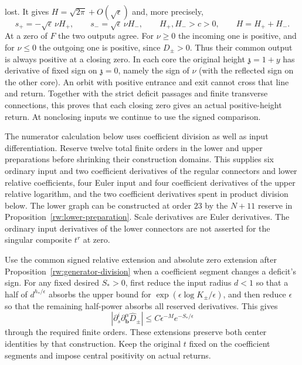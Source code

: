 lost. It gives $H=\sqrt{2\pi}+O(\sqrt\epsilon)$ and, more precisely,
\[
 s_+=-\sqrt\epsilon\,\nu H_+,
 \qquad s_-=\sqrt\epsilon\,\nu H_-,
 \qquad H_+,H_->c>0,\qquad H=H_++H_-.
\]
At a zero of $F$ the two outputs agree. For $\nu\ge0$ the
incoming one is positive, and for $\nu\le0$ the outgoing one is
positive, since $D_\pm>0$. Thus their common output is always
positive at a closing zero. In each core the original height
$\mathfrak z=1+y$ has derivative of fixed sign on $\mathfrak z=0$,
namely the sign of $\nu$ (with the reflected sign on the other
core). An orbit with positive entrance and exit cannot cross that
line and return. Together with the strict deficit passages and finite
transverse connections, this proves that each closing zero gives an actual
positive-height return. At nonclosing inputs we continue to use the
signed comparison.

The numerator calculation below uses coefficient division as well as
input differentiation. Reserve twelve total finite orders in the lower
and upper preparations before shrinking their construction domains.
This supplies six ordinary input and two coefficient derivatives of the regular connectors and
lower relative coefficients, four Euler input and four coefficient
derivatives of the upper relative logarithm, and the two coefficient
derivatives spent in product division below. The lower graph can be
constructed at order $23$ by the $N+11$ reserve in
Proposition~\ref{rw:lower-preparation}. Scale derivatives are Euler
derivatives. The ordinary input derivatives of the lower connectors
are not asserted for the singular composite $t^r$ at zero.

Use the common signed relative extension and absolute zero extension
after Proposition~\ref{rw:generator-division} when a coefficient
segment changes a deficit's sign.
For any fixed desired $S_*>0$, first reduce the input radius $d<1$
so that a half of $d^{h_*/\epsilon}$ absorbs the upper bound for
$\exp(\epsilon\log K_\pm/\epsilon)$, and then reduce $\epsilon$
so that the remaining half-power absorbs all reserved derivatives.
This gives
\begin{equation}\label{rw:finite:three-flat}
 |\partial_s^i\partial_{\mathbf b}^{\alpha}\widehat D_\pm|
       \le C\epsilon^{-M}e^{-S_*/\epsilon}
\end{equation}
through the required finite orders. These extensions preserve both
center identities by that construction.
Keep the original $t$ fixed on the coefficient segments and impose
central positivity on actual returns.

